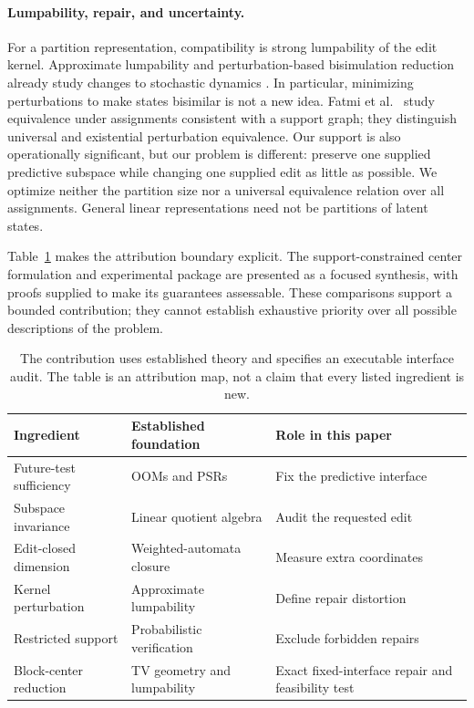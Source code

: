 \documentclass[11pt,letterpaper]{article}
\begin{document}
\paragraph{Lumpability, repair, and uncertainty.}
For a partition representation, compatibility is strong lumpability of the edit kernel. Approximate lumpability and perturbation-based bisimulation reduction already study changes to stochastic dynamics \citep{georgiou2019,kiefertang2021}. In particular, minimizing perturbations to make states bisimilar is not a new idea. Fatmi et al.\ \citep{fatmi2026} study equivalence under assignments consistent with a support graph; they distinguish universal and existential perturbation equivalence. Our support is also operationally significant, but our problem is different: preserve one supplied predictive subspace while changing one supplied edit as little as possible. We optimize neither the partition size nor a universal equivalence relation over all assignments. General linear representations need not be partitions of latent states.

Table~\ref{tab:position} makes the attribution boundary explicit. The support-constrained center formulation and experimental package are presented as a focused synthesis, with proofs supplied to make its guarantees assessable. These comparisons support a bounded contribution; they cannot establish exhaustive priority over all possible descriptions of the problem.

\begin{table}[t]
\centering\small
\begin{tabular}{p{.27\linewidth}p{.30\linewidth}p{.34\linewidth}}
\toprule
Ingredient & Established foundation & Role in this paper\\\midrule
Future-test sufficiency & OOMs and PSRs & Fix the predictive interface\\
Subspace invariance & Linear quotient algebra & Audit the requested edit\\
Edit-closed dimension & Weighted-automata closure & Measure extra coordinates\\
Kernel perturbation & Approximate lumpability & Define repair distortion\\
Restricted support & Probabilistic verification & Exclude forbidden repairs\\
Block-center reduction & TV geometry and lumpability & Exact fixed-interface repair and feasibility test\\
\bottomrule
\end{tabular}
\caption{The contribution uses established theory and specifies an executable interface audit. The table is an attribution map, not a claim that every listed ingredient is new.}\label{tab:position}
\end{table}
\end{document}
